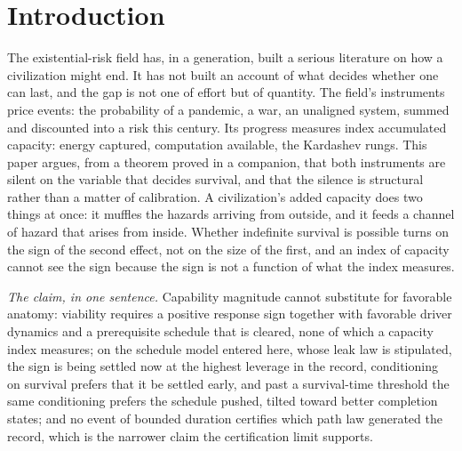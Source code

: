 \section{Introduction}\label{sec:intro}

The existential-risk field has, in a generation, built a serious
literature on how a civilization might end. It has not built an account
of what decides whether one can last, and the gap is not one of effort
but of quantity. The field's instruments price events: the probability
of a pandemic, a war, an unaligned system, summed and discounted into a
risk this century. Its progress measures index accumulated capacity:
energy captured, computation available, the Kardashev rungs. This paper
argues, from a theorem proved in a companion, that both instruments are
silent on the variable that decides survival, and that the silence is
structural rather than a matter of calibration. A civilization's added
capacity does two things at once: it muffles the hazards arriving from
outside, and it feeds a channel of hazard that arises from inside.
Whether indefinite survival is possible turns on the sign of the second
effect, not on the size of the first, and an index of capacity cannot
see the sign because the sign is not a function of what the index
measures.

\emph{The claim, in one sentence.} Capability magnitude cannot
substitute for favorable anatomy: viability requires a positive response
sign together with favorable driver dynamics and a prerequisite
schedule that is cleared, none of which a capacity index measures; on
the schedule model entered here, whose leak law is stipulated, the sign
is being settled now at the highest leverage in the record, conditioning
on survival prefers that it be settled early, and past a survival-time
threshold the same conditioning prefers the schedule pushed, tilted
toward better completion states; and no event of bounded duration certifies which path law generated the record, which is the narrower claim the certification limit supports.

